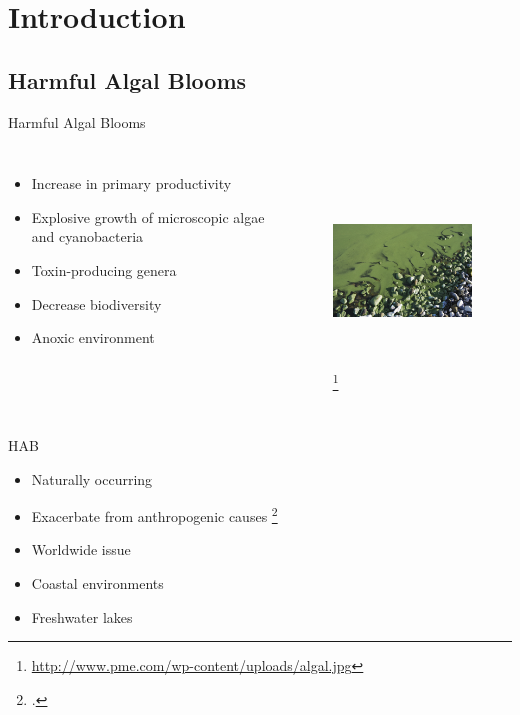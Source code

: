 \section{Introduction}

\subsection{Harmful Algal Blooms}
\begin{frame}{Harmful Algal Blooms}

\begin{columns}

	\begin{itemize}
		\item Increase in primary productivity
		\item Explosive growth of microscopic algae and cyanobacteria
		\item Toxin-producing genera
		\item Decrease biodiversity
		\item Anoxic environment
	\end{itemize}

	\begin{figure}
		\hspace*{-1cm}
		\includegraphics[width=2in,height=2in]{algal.jpg}
		\footnote{\url{http://www.pme.com/wp-content/uploads/algal.jpg}}
	\end{figure}
\end{columns}

\end{frame}
\begin{frame}{HAB}

	\begin{itemize}
		\item Naturally occurring
		\item Exacerbate from anthropogenic causes \footcite{rastogi_cyanotoxin-microcystins:_2014}
		\item Worldwide issue
		\item Coastal environments
		\item Freshwater lakes
	\end{itemize}

\end{frame}

